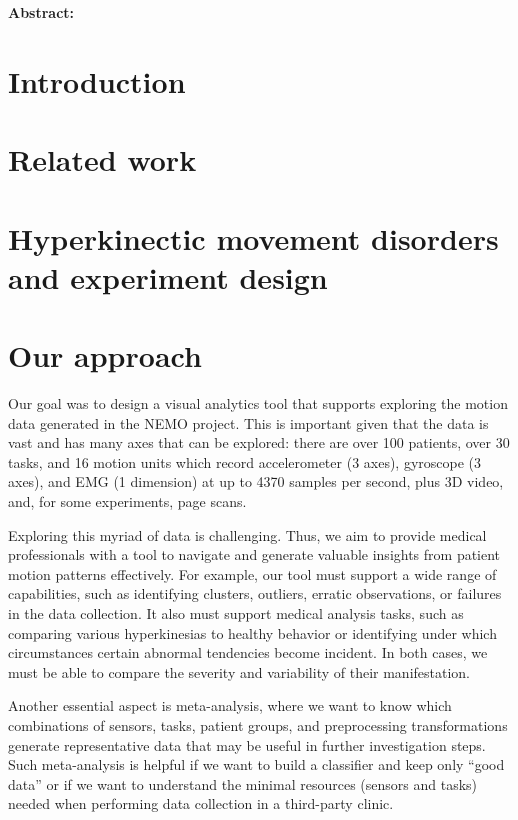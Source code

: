 
\noindent \textbf{Abstract:}

\section{Introduction}

\section{Related work}

\section{Hyperkinectic movement disorders and experiment design}

\section{Our approach}

Our goal was to design a visual analytics tool that supports exploring the motion data generated in the NEMO project. This is important given that the data is vast and has many axes that can be explored: there are over 100 patients, over 30 tasks, and 16 motion units which record accelerometer (3 axes), gyroscope (3 axes), and EMG (1 dimension) at up to 4370 samples per second, plus 3D video, and, for some experiments, page scans. 

Exploring this myriad of data is challenging. Thus, we aim to provide medical professionals with a tool to navigate and generate valuable insights from patient motion patterns effectively. For example, our tool must support a wide range of capabilities, such as identifying clusters, outliers, erratic observations, or failures in the data collection. It also must support medical analysis tasks, such as comparing various hyperkinesias to healthy behavior or identifying under which circumstances certain abnormal tendencies become incident. In both cases, we must be able to compare the severity and variability of their manifestation.

Another essential aspect is meta-analysis, where we want to know which combinations of sensors, tasks, patient groups, and preprocessing transformations generate representative data that may be useful in further investigation steps. Such meta-analysis is helpful if we want to build a classifier and keep only ``good data'' or if we want to understand the minimal resources (sensors and tasks) needed when performing data collection in a third-party clinic.

